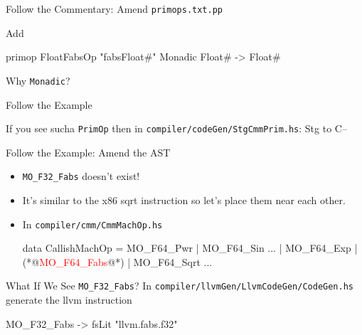\documentclass[presentation]{beamer}
\begin{document}
\begin{frame}[fragile]{Follow the Commentary: Amend \texttt{primops.txt.pp}}

  Add
  \begin{haskelL}
    primop FloatFabsOp "fabsFloat#" Monadic
           Float# -> Float#
  \end{haskelL}

  Why \texttt{Monadic}?

\end{frame}

\begin{frame}[fragile]{Follow the Example}

  If you see sucha \texttt{PrimOp} then in \texttt{compiler/codeGen/StgCmmPrim.hs}: Stg to C--

\end{frame}

\begin{frame}[fragile]{Follow the Example: Amend the AST}

  \begin{itemize}
    \item \texttt{MO\_F32\_Fabs} doesn't exist!
    \item It's similar to the x86 sqrt instruction so let's place them near each other.
    \item In \texttt{compiler/cmm/CmmMachOp.hs}
      \begin{haskelL}
        data CallishMachOp
        = MO_F64_Pwr
        | MO_F64_Sin
        ...
        | MO_F64_Exp
        | (*@\textcolor{red}{MO\_F64\_Fabs}@*)
        | MO_F64_Sqrt
        ...
      \end{haskelL}
  \end{itemize}
\end{frame}

\begin{frame}[fragile]{What If We See \texttt{MO\_F32\_Fabs}?}
  In \texttt{compiler/llvmGen/LlvmCodeGen/CodeGen.hs} generate the llvm instruction
  \begin{haskelL}
    MO_F32_Fabs -> fsLit "llvm.fabs.f32"
  \end{haskelL}

\end{frame}
\end{document}
